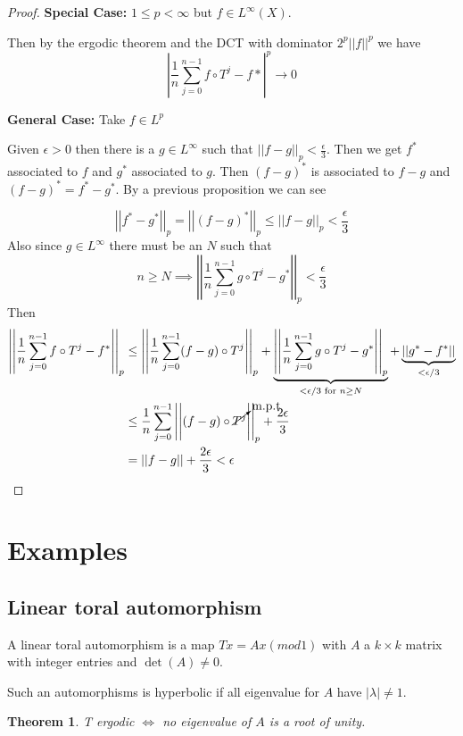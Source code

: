 \documentclass[11pt]{article}
\newcommand{\abs}[1]{\left|#1\right|}
\newcommand{\norm}[1]{\left|\left|#1\right|\right|}
\newenvironment{defin}
	{\begin{mdframed}[backgroundcolor=white, roundcorner=5pt, linewidth=1pt, linecolor=RoyalBlue]}
	{\end{mdframed}}
\newcommand{\mdf}[1]{{\color{RoyalBlue} #1}}
\newtheorem{theorem}[prop]{Theorem}
\begin{document}
\begin{proof}
\textbf{Special Case: }$1\leq p < \infty$ but $f\in L^\infty(X)$.

Then by the ergodic theorem and the DCT with dominator $2^p\norm{f}^p$ we have
\[
	\abs{\frac{1}{n}\sum_{j=0}^{n-1}f\circ T^j - f*}^p \to 0
\]

\textbf{General Case: }Take $f\in L^p$

Given $\epsilon >0$ then there is a $g\in L^\infty$ such that $\norm{f-g}_p < \frac{\epsilon}{3}$.
Then we get $f^\ast$ associated to $f$ and $g^\ast$ associated to $g$.
Then $(f-g)^\ast$ is associated to $f-g$ and $(f-g)^\ast=f^\ast - g^\ast$.
By a previous proposition we can see

\[
	\norm{f^\ast-g^\ast}_p = \norm{(f-g)^\ast}_p \leq \norm{f-g}_p < \frac{\epsilon}{3}
\]
Also since $g\in L^\infty$ there must be an $N$ such that
\[
	n\geq N \implies \norm{\frac{1}{n}\sum_{j=0}^{n-1}g\circ T^j - g^\ast}_p < \frac{\epsilon}{3}
\]
Then
\begin{align*}
	\norm{\frac{1}{n}\sum_{j=0}^{n-1}f\circ T^j - f^\ast}_p & \leq \norm{\frac{1}{n}\sum_{j=0}^{n-1}(f-g)\circ T^j}_p +  \underbrace{\norm{\frac{1}{n}\sum_{j=0}^{n-1}g\circ T^j - g^\ast}_p}_{<\epsilon/3 \text{ for }n\geq N} + \underbrace{\norm{g^\ast - f^\ast}}_{<\epsilon/3} \\
															& \leq \frac{1}{n}\sum_{j=0}^{n-1}\norm{(f-g)\circ \cancelto{\text{m.p.t}}{T^j}}_p + \frac{2\epsilon}{3}\\
															& = \norm{f-g} + \frac{2\epsilon}{3} < \epsilon
\end{align*}
\end{proof}

\section{Examples}
\subsection{Linear toral automorphism}
\begin{defin}
A \mdf{linear toral automorphism} is a map $Tx=Ax (mod 1)$ with $A$ a $k\times k$ matrix with integer entries and $\det(A)\neq 0$.

Such an automorphisms is \mdf{hyperbolic} if all eigenvalue for $A$ have $|\lambda|\neq 1$.
\end{defin}
\begin{theorem}
T ergodic $\iff$ no eigenvalue of $A$ is a root of unity.
\end{theorem}
\end{document}
